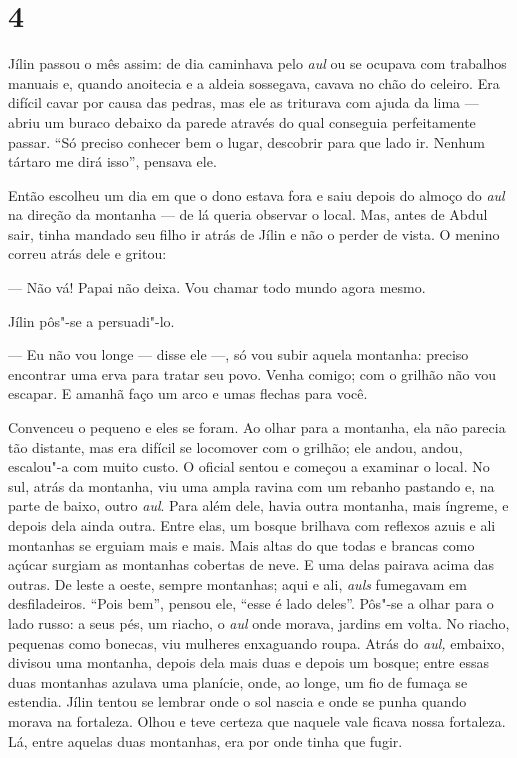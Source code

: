 \section{4}

Jílin passou o mês assim: de dia caminhava pelo \emph{aul} ou se ocupava
com trabalhos manuais e, quando anoitecia e a aldeia sossegava, cavava
no chão do celeiro. Era difícil cavar por causa das pedras, mas ele as
triturava com ajuda da lima --- abriu um buraco debaixo da parede
através do qual conseguia perfeitamente passar. ``Só preciso conhecer
bem o lugar, descobrir para que lado ir. Nenhum tártaro me dirá isso'',
pensava ele.

Então escolheu um dia em que o dono estava fora e saiu depois do almoço
do \emph{aul} na direção da montanha --- de lá queria observar o local.
Mas, antes de Abdul sair, tinha mandado seu filho ir atrás de Jílin e
não o perder de vista. O menino correu atrás dele e gritou:

--- Não vá! Papai não deixa. Vou chamar todo mundo agora mesmo.

Jílin pôs"-se a persuadi"-lo.

--- Eu não vou longe --- disse ele ---, só vou subir aquela montanha:
preciso encontrar uma erva para tratar seu povo. Venha comigo; com o
grilhão não vou escapar. E amanhã faço um arco e umas flechas para você.

Convenceu o pequeno e eles se foram. Ao olhar para a montanha, ela não
parecia tão distante, mas era difícil se locomover com o grilhão; ele
andou, andou, escalou"-a com muito custo. O oficial sentou e começou a
examinar o local. No sul, atrás da montanha, viu uma ampla ravina com um
rebanho pastando e, na parte de baixo, outro \emph{aul}. Para além
dele, havia outra montanha, mais íngreme, e depois dela ainda
outra. Entre elas, um bosque brilhava com reflexos azuis e ali montanhas
se erguiam mais e mais. Mais altas do que todas e brancas como açúcar
surgiam as montanhas cobertas de neve. E uma delas pairava acima das
outras. De leste a oeste, sempre montanhas; aqui e ali, \emph{auls}
fumegavam em desfiladeiros. ``Pois bem'', pensou ele, ``esse é lado
deles''. Pôs"-se a olhar para o lado russo: a seus pés, um riacho, o
\emph{aul} onde morava, jardins em volta. No riacho, pequenas
como bonecas, viu mulheres enxaguando roupa. Atrás do \emph{aul,}
embaixo, divisou uma montanha, depois dela mais duas e depois um bosque;
entre essas duas montanhas azulava uma planície, onde, ao longe, um fio
de fumaça se estendia. Jílin tentou se lembrar onde o sol nascia e onde
se punha quando morava na fortaleza. Olhou e teve certeza que naquele
vale ficava nossa fortaleza. Lá, entre aquelas duas montanhas, era por
onde tinha que fugir.

